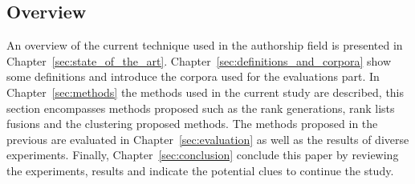 \subsection{Overview}

An overview of the current technique used in the authorship field is presented in Chapter~\ref{sec:state_of_the_art}.
Chapter~\ref{sec:definitions_and_corpora} show some definitions and introduce the corpora used for the evaluations part.
In Chapter~\ref{sec:methods} the methods used in the current study are described, this section encompasses methods proposed such as the rank generations, rank lists fusions and the clustering proposed methods.
The methods proposed in the previous are evaluated in Chapter~\ref{sec:evaluation} as well as the results of diverse experiments.
Finally, Chapter~\ref{sec:conclusion} conclude this paper by reviewing the experiments, results and indicate the potential clues to continue the study.

